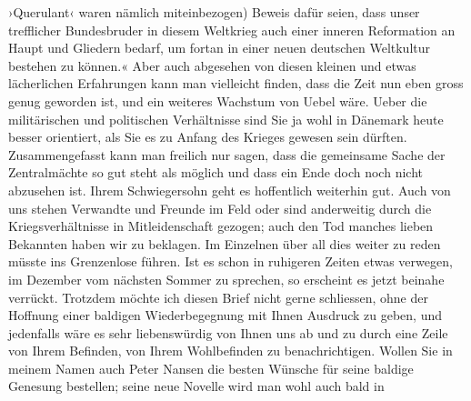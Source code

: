 \begin{ledgroupsized}[t]{13cm}
                     ›Querulant‹ waren nämlich miteinbezogen)
                  Beweis dafür seien, dass unser trefflicher Bundesbruder in diesem Weltkrieg auch
                  einer inneren Reformation an Haupt und Gliedern bedarf, um fortan in einer neuen
                  deutschen Weltkultur bestehen zu können.«\pend
           \pstart
           Aber auch abgesehen von diesen kleinen und etwas lächerlichen Erfahrungen kann man
               vielleicht finden, dass die Zeit nun eben gross genug geworden ist, und ein weiteres
               Wachstum von Uebel wäre. Ueber die militärischen und politischen Verhältnisse sind
               Sie ja wohl in Dänemark heute besser
               orientiert, als Sie es zu Anfang des Krieges gewesen \introOben{}sein\introOben{}
               dürften. Zusammengefasst kann man freilich nur sagen, dass die gemeinsame Sache der
               Zentralmächte so gut steht als möglich und dass ein Ende doch noch nicht abzusehen
               ist. Ihrem Schwiegersohn geht
               es hoffentlich weiterhin gut. Auch von uns stehen Verwandte und Freunde im Feld oder
               sind anderweitig durch die Kriegsverhältnisse in Mitleidenschaft gezogen; auch den
               Tod manches lieben {\pb}Bekannten haben wir zu
               beklagen. Im Einzelnen über all dies weiter zu reden müsste ins Grenzenlose führen.
               Ist es schon in ruhigeren Zeiten etwas verwegen, im Dezember vom nächsten Sommer zu
               sprechen, so erscheint es jetzt beinahe verrückt. Trotzdem möchte ich diesen Brief
               nicht gerne schliessen, ohne der Hoffnung einer baldigen Wiederbegegnung mit Ihnen
               Ausdruck zu geben, und jedenfalls wäre es sehr liebenswürdig von Ihnen uns ab und zu
               durch eine Zeile von Ihrem Befinden, von Ihrem Wohlbefinden zu benachrichtigen.
               Wollen Sie in meinem Namen auch Peter Nansen
               die besten Wünsche für seine baldige Genesung bestellen; seine neue Novelle wird man wohl auch bald in

\end{ledgroupsized}
